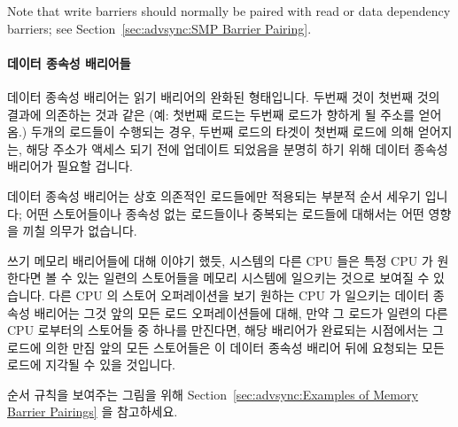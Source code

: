 \begin{enumerate}
Note that write barriers should normally be paired with read
or data dependency barriers; see
Section~\ref{sec:advsync:SMP Barrier Pairing}.
\fi

\paragraph{데이터 종속성 배리어들}

데이터 종속성 배리어는 읽기 배리어의 완화된 형태입니다.
두번째 것이 첫번째 것의 결과에 의존하는 것과 같은 (예: 첫번째 로드는 두번째
로드가 향하게 될 주소를 얻어옴.) 두개의 로드들이 수행되는 경우, 두번째 로드의
타겟이 첫번째 로드에 의해 얻어지는, 해당 주소가 액세스 되기 전에 업데이트
되었음을 분명히 하기 위해 데이터 종속성 배리어가 필요할 겁니다.

데이터 종속성 배리어는 상호 의존적인 로드들에만 적용되는 부분적 순서 세우기
입니다; 어떤 스토어들이나 종속성 없는 로드들이나 중복되는 로드들에 대해서는
어떤 영향을 끼칠 의무가 없습니다.

쓰기 메모리 배리어들에 대해 이야기 했듯, 시스템의 다른 CPU 들은 특정 CPU 가
원한다면 볼 수 있는 일련의 스토어들을 메모리 시스템에 일으키는 것으로 보여질 수
있습니다.
다른 CPU 의 스토어 오퍼레이션을 보기 원하는 CPU 가 일으키는 데이터 종속성
배리어는 그것 앞의 모든 로드 오퍼레이션들에 대해, 만약 그 로드가 일련의 다른
CPU 로부터의 스토어들 중 하나를 만진다면, 해당 배리어가 완료되는 시점에서는 그
로드에 의한 만짐 앞의 모든 스토어들은 이 데이터 종속성 배리어 뒤에 요청되는
모든 로드에 지각될 수 있을 것입니다.

순서 규칙을 보여주는 그림을 위해 Section~\ref{sec:advsync:Examples of Memory
Barrier Pairings} 을 참고하세요.


\end{enumerate}
